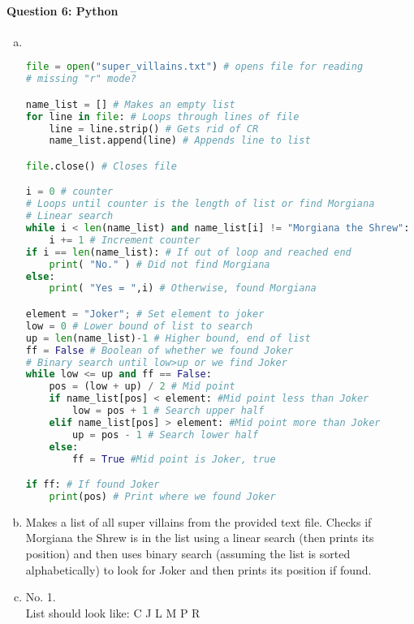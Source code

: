 \documentclass[12 pt]{article}
\begin{document}
\paragraph{Question 6: Python}
\begin{enumerate}[a)]
\item ~
\begin{lstlisting}[language=python]
file = open("super_villains.txt") # opens file for reading
# missing "r" mode?

name_list = [] # Makes an empty list
for line in file: # Loops through lines of file
    line = line.strip() # Gets rid of CR
    name_list.append(line) # Appends line to list

file.close() # Closes file

i = 0 # counter
# Loops until counter is the length of list or find Morgiana
# Linear search
while i < len(name_list) and name_list[i] != "Morgiana the Shrew":
    i += 1 # Increment counter
if i == len(name_list): # If out of loop and reached end
    print( "No." ) # Did not find Morgiana
else: 
    print( "Yes = ",i) # Otherwise, found Morgiana

element = "Joker"; # Set element to joker
low = 0 # Lower bound of list to search
up = len(name_list)-1 # Higher bound, end of list
ff = False # Boolean of whether we found Joker
# Binary search until low>up or we find Joker
while low <= up and ff == False:
    pos = (low + up) / 2 # Mid point
    if name_list[pos] < element: #Mid point less than Joker
        low = pos + 1 # Search upper half
    elif name_list[pos] > element: #Mid point more than Joker
        up = pos - 1 # Search lower half
    else:
        ff = True #Mid point is Joker, true

if ff: # If found Joker
    print(pos) # Print where we found Joker
\end{lstlisting}
\item Makes a list of all super villains from the provided text file. Checks if Morgiana the Shrew is in the list using a linear search (then prints its position) and then uses binary search (assuming the list is sorted alphabetically) to look for Joker and then prints its position if found.
\item No. 1.
  \\List should look like: C J L M P R
\end{enumerate}
\end{document}
